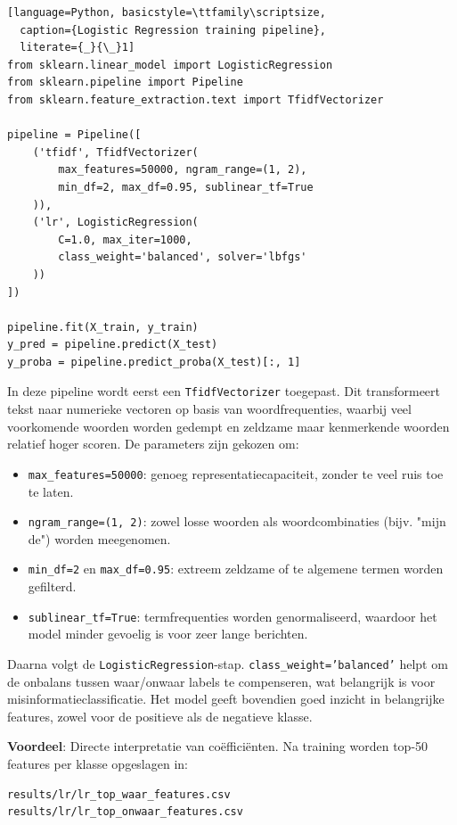 \begin{lstlisting}[language=Python, basicstyle=\ttfamily\scriptsize,
  caption={Logistic Regression training pipeline},
  literate={_}{\_}1]
from sklearn.linear_model import LogisticRegression
from sklearn.pipeline import Pipeline
from sklearn.feature_extraction.text import TfidfVectorizer

pipeline = Pipeline([
    ('tfidf', TfidfVectorizer(
        max_features=50000, ngram_range=(1, 2),
        min_df=2, max_df=0.95, sublinear_tf=True
    )),
    ('lr', LogisticRegression(
        C=1.0, max_iter=1000,
        class_weight='balanced', solver='lbfgs'
    ))
])

pipeline.fit(X_train, y_train)
y_pred = pipeline.predict(X_test)
y_proba = pipeline.predict_proba(X_test)[:, 1]
\end{lstlisting}

In deze pipeline wordt eerst een \texttt{TfidfVectorizer} toegepast. Dit
transformeert tekst naar numerieke vectoren op basis van woordfrequenties,
waarbij veel voorkomende woorden worden gedempt en zeldzame maar kenmerkende
woorden relatief hoger scoren. De parameters zijn gekozen om:

\begin{itemize}
    \item \texttt{max\_features=50000}: genoeg representatiecapaciteit,
          zonder te veel ruis toe te laten.
    \item \texttt{ngram\_range=(1, 2)}: zowel losse woorden als woordcombinaties
          (bijv. "mijn de") worden meegenomen.
    \item \texttt{min\_df=2} en \texttt{max\_df=0.95}: extreem zeldzame of
          te algemene termen worden gefilterd.
    \item \texttt{sublinear\_tf=True}: termfrequenties worden genormaliseerd,
          waardoor het model minder gevoelig is voor zeer lange berichten.
\end{itemize}

Daarna volgt de \texttt{LogisticRegression}-stap. \texttt{class\_weight='balanced'}
helpt om de onbalans tussen waar/onwaar labels te compenseren, wat belangrijk is
voor misinformatieclassificatie. Het model geeft bovendien goed inzicht in
belangrijke features, zowel voor de positieve als de negatieve klasse.

\textbf{Voordeel}: Directe interpretatie van coëfficiënten. Na training
worden top-50 features per klasse opgeslagen in:

\begin{verbatim}
results/lr/lr_top_waar_features.csv
results/lr/lr_top_onwaar_features.csv
\end{verbatim}

